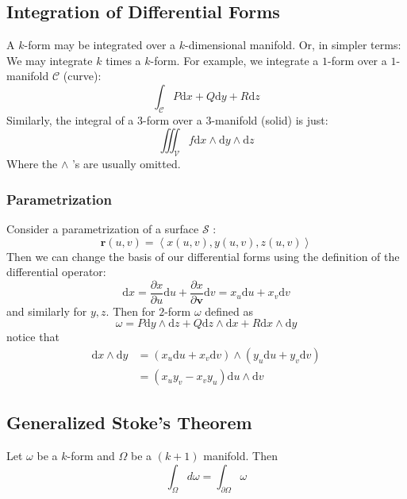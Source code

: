 \documentclass[twocolumn,10pt]{article}
\begin{document}
\subsection{Integration of Differential Forms}
A $k$-form may be integrated over a $k$-dimensional manifold. Or, in simpler terms: We may integrate $k$ times a $k$-form.
For example, we integrate a $1$-form over a $1$-manifold $\mathcal{C}$ (curve):
\[
	\int_{\mathcal{C}} P \mathrm{d} x + Q \mathrm{d} y + R \mathrm{d} z
\] 
Similarly, the integral of a $3$-form over a $3$-manifold (solid) is just:
\[
	\iiint_\mathcal{V} f \mathrm{d} x \wedge \mathrm{d}y \wedge \mathrm{d} z  
\] 
Where the $\wedge$ 's are usually omitted.
\subsubsection{Parametrization}
Consider a parametrization of a surface $\mathcal{S}$ :
\[
\mathbf{r} (u,v) = \left\langle x(u,v),y(u,v),z(u,v) \right\rangle 
\] 
Then we can change the basis of our differential forms using the definition of the differential operator:
\[
\mathrm{d} x = \frac{\partial x}{\partial u} \mathrm{d} u + \frac{\partial x}{\partial \mathbf{v} } \mathrm{d} v = x_u \mathrm{d} u + x_v \mathrm{d} v
\] 
and similarly for $y,z$. Then for $2$-form $\omega$ defined as 
\[
\omega = P \mathrm{d} y \wedge \mathrm{d} z + Q \mathrm{d} z \wedge \mathrm{d} x + R \mathrm{d} x \wedge \mathrm{d} y
\] 
notice that 
\begin{align*}
	\mathrm{d} x \wedge \mathrm{d} y &= (x_u \mathrm{d} u + x_v \mathrm{d} v) \wedge (y_u \mathrm{d} u + y_v \mathrm{d} v)\\
									 &= (x_u y_v - x_v y_u)\mathrm{d} u \wedge \mathrm{d} v
\end{align*}
\subsection{Generalized Stoke's Theorem}
Let $\omega$ be a $k$-form and $\Omega$ be a $(k+1)$ manifold. Then
\[
	\int_\Omega d\omega = \int_{\partial \Omega} \omega
\] 
\end{document}
